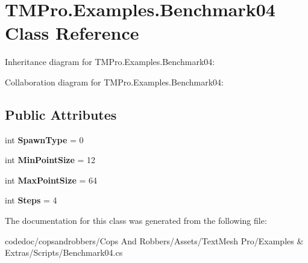 \hypertarget{classTMPro_1_1Examples_1_1Benchmark04}{}\section{T\+M\+Pro.\+Examples.\+Benchmark04 Class Reference}
\label{classTMPro_1_1Examples_1_1Benchmark04}


Inheritance diagram for T\+M\+Pro.\+Examples.\+Benchmark04\+:


Collaboration diagram for T\+M\+Pro.\+Examples.\+Benchmark04\+:
\subsection*{Public Attributes}
\begin{DoxyCompactItemize}
\item 
\mbox{\label{classTMPro_1_1Examples_1_1Benchmark04_ae0ed0b5b3b4420880d61a9898689b99b}} 
int {\bfseries Spawn\+Type} = 0
\item 
\mbox{\label{classTMPro_1_1Examples_1_1Benchmark04_a85eba46098210950a9d7c3d05ed3ff66}} 
int {\bfseries Min\+Point\+Size} = 12
\item 
\mbox{\label{classTMPro_1_1Examples_1_1Benchmark04_ac46a1dbaedb058606168ac613b37e4a7}} 
int {\bfseries Max\+Point\+Size} = 64
\item 
\mbox{\label{classTMPro_1_1Examples_1_1Benchmark04_abf9ed65203897e474c369e98aa8fa325}} 
int {\bfseries Steps} = 4
\end{DoxyCompactItemize}


The documentation for this class was generated from the following file\+:\begin{DoxyCompactItemize}
\item 
codedoc/copsandrobbers/\+Cops And Robbers/\+Assets/\+Text\+Mesh Pro/\+Examples \& Extras/\+Scripts/Benchmark04.\+cs\end{DoxyCompactItemize}

